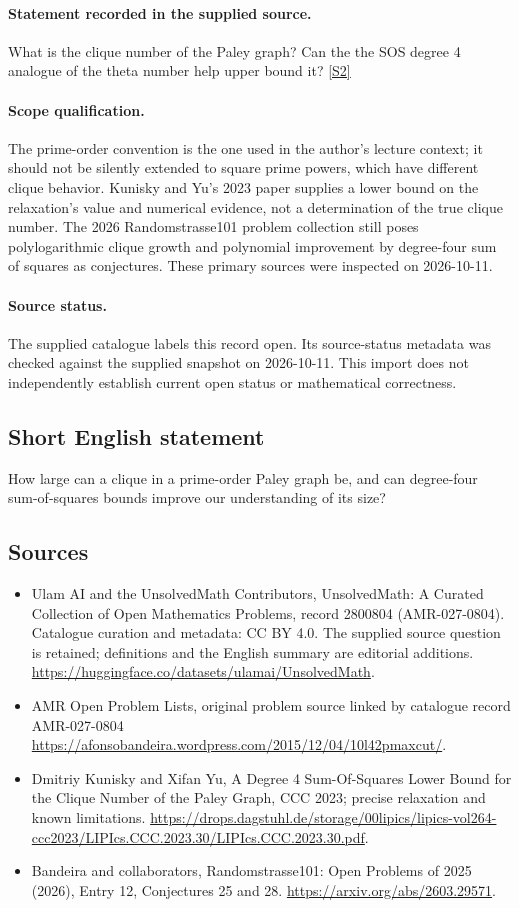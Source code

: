 \documentclass[11pt]{article}
\begin{document}
\paragraph{Statement recorded in the supplied source.}
What is the clique number of the Paley graph? Can the the SOS degree 4 analogue of the theta number help upper bound it? \href{https://afonsobandeira.wordpress.com/2015/12/04/10l42pmaxcut/}{[S2]}
\paragraph{Scope qualification.}
The prime-order convention is the one used in the author's lecture context; it should not be silently extended to square prime powers, which have different clique behavior. Kunisky and Yu's 2023 paper supplies a lower bound on the relaxation's value and numerical evidence, not a determination of the true clique number. The 2026 Randomstrasse101 problem collection still poses polylogarithmic clique growth and polynomial improvement by degree-four sum of squares as conjectures. These primary sources were inspected on 2026-10-11.
\paragraph{Source status.}
The supplied catalogue labels this record open. Its source-status metadata was checked against the supplied snapshot on 2026-10-11. This import does not independently establish current open status or mathematical correctness.
\subsection{Short English statement}
How large can a clique in a prime-order Paley graph be, and can degree-four sum-of-squares bounds improve our understanding of its size?
\subsection{Sources}
\begin{itemize}
\item[S1] Ulam AI and the UnsolvedMath Contributors, UnsolvedMath: A Curated Collection of Open Mathematics Problems, record 2800804 (AMR-027-0804). Catalogue curation and metadata: CC BY 4.0. The supplied source question is retained; definitions and the English summary are editorial additions.
\url{https://huggingface.co/datasets/ulamai/UnsolvedMath}.
\item[S2] AMR Open Problem Lists, original problem source linked by catalogue record AMR-027-0804
\url{https://afonsobandeira.wordpress.com/2015/12/04/10l42pmaxcut/}.
\item[S3] Dmitriy Kunisky and Xifan Yu, A Degree 4 Sum-Of-Squares Lower Bound for the Clique Number of the Paley Graph, CCC 2023; precise relaxation and known limitations.
\url{https://drops.dagstuhl.de/storage/00lipics/lipics-vol264-ccc2023/LIPIcs.CCC.2023.30/LIPIcs.CCC.2023.30.pdf}.
\item[S4] Bandeira and collaborators, Randomstrasse101: Open Problems of 2025 (2026), Entry 12, Conjectures 25 and 28.
\url{https://arxiv.org/abs/2603.29571}.
\end{itemize}
\end{document}

